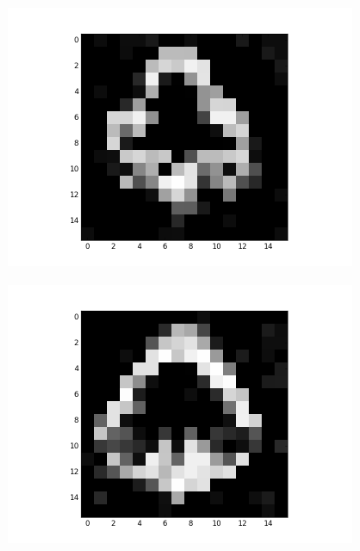\begin{figure}[h!]
\begin{subfigure}{.25\textwidth}
  		\includegraphics[width=\linewidth]{imgs/poker/recon_img5.png}
  		\label{fig:sub1}
	\end{subfigure}%
	\begin{subfigure}{.25\textwidth}
  		\centering
  		\includegraphics[width=\linewidth]{imgs/poker/recon_img7.png}
  		\label{fig:sub1}
	\end{subfigure}%
	

\end{figure}
